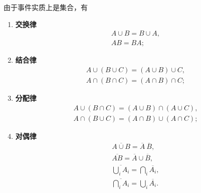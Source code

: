 \begin{theorem}[事件的运算规律]
由于事件实质上是集合，有
\begin{enumerate}
	\item {\bf 交换律}
	\begin{gather}
		A \cup B = B \cup A, \\
		A B = B A;
	\end{gather}

	\item {\bf 结合律}
	\begin{gather}
		A \cup (B \cup C) = (A \cup B) \cup C, \\
		A \cap (B \cap C) = (A \cap B) \cap C;
	\end{gather}

	\item {\bf 分配律}
	\begin{gather}
		A \cup (B \cap C) = (A \cup B) \cap (A \cup C), \\
		A \cap (B \cup C) = (A \cap B) \cup (A \cap C);
	\end{gather}

	\item {\bf 对偶律}
	\begin{gather}
		\overline{A \cup B} = \overline{A}\ \overline{B}, \\
		\overline{AB} = \overline{A} \cup \overline{B}, \\
		\overline{\bigcup_i A_i} = \bigcap_i \overline{A_i}, \\
		\overline{\bigcap_i A_i} = \bigcup_i \overline{A_i}.
	\end{gather}
\end{enumerate}
\end{theorem}
